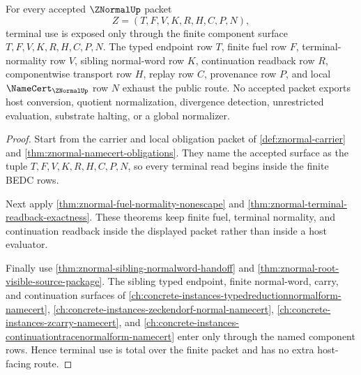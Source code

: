 \begin{theorem}
\label{thm:znormal-terminal-route-component-totality}
For every accepted $\ZNormalUp$ packet
$$
Z=(T,F,V,K,R,H,C,P,N),
$$
terminal use is exposed only through the finite component surface $T,F,V,K,R,H,C,P,N$. The typed endpoint row $T$, finite fuel row $F$, terminal-normality row $V$, sibling normal-word row $K$, continuation readback row $R$, componentwise transport row $H$, replay row $C$, provenance row $P$, and local $\NameCert_{\ZNormalUp}$ row $N$ exhaust the public route. No accepted packet exports host conversion, quotient normalization, divergence detection, unrestricted evaluation, substrate halting, or a global normalizer.
\end{theorem}
\begin{proof}
Start from the carrier and local obligation packet of \autoref{def:znormal-carrier} and \autoref{thm:znormal-namecert-obligations}. They name the accepted surface as the tuple $T,F,V,K,R,H,C,P,N$, so every terminal read begins inside the finite BEDC rows.

Next apply \autoref{thm:znormal-fuel-normality-nonescape} and \autoref{thm:znormal-terminal-readback-exactness}. These theorems keep finite fuel, terminal normality, and continuation readback inside the displayed packet rather than inside a host evaluator.

Finally use \autoref{thm:znormal-sibling-normalword-handoff} and \autoref{thm:znormal-root-visible-source-package}. The sibling typed endpoint, finite normal-word, carry, and continuation surfaces of \autoref{ch:concrete-instances-typedreductionnormalform-namecert}, \autoref{ch:concrete-instances-zeckendorf-normal-namecert}, \autoref{ch:concrete-instances-zcarry-namecert}, and \autoref{ch:concrete-instances-continuationtracenormalform-namecert} enter only through the named component rows. Hence terminal use is total over the finite packet and has no extra host-facing route.
\end{proof}

